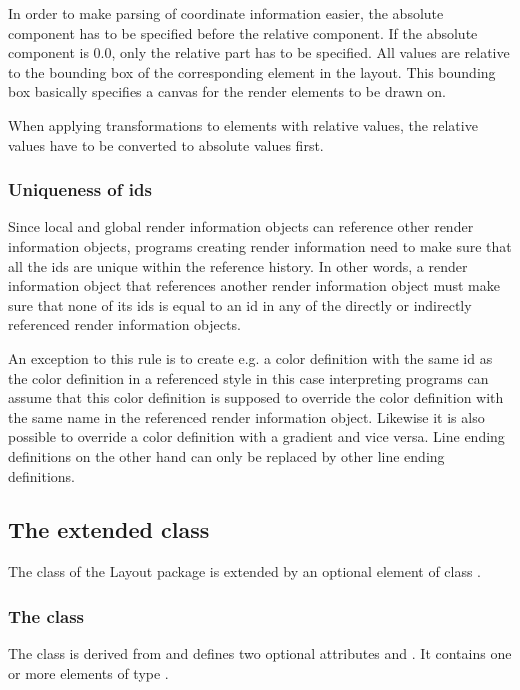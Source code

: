 In order to make parsing of coordinate information easier, the absolute 
component has to be specified before the relative component. If the absolute component is 0.0, only the relative part has to be specified.
All values are relative to the bounding box of the corresponding 
element in the layout. This bounding box basically specifies a canvas for the 
render elements to be drawn on.

When applying transformations to elements with relative values, the relative values have to be converted to absolute values first.



\subsubsection{Uniqueness of ids}
Since local and global render information objects can reference other render information objects, programs creating
render information need to make sure that all the ids are unique within the reference history. In other words, a 
render information object that references another render information object must make sure that none of its ids is equal
to an id in any of the directly or indirectly referenced render information objects. 

An exception to this rule is to create e.g. a color definition with the same id as the color definition in a referenced style
in this case interpreting programs can assume that this color definition is supposed to override the color definition  with the
same name in the referenced render information object. Likewise it is also possible to override a color definition with a 
gradient and vice versa. Line ending definitions on the other hand can only be replaced by other line ending definitions.

\subsection{The extended \ListOfLayouts class}
The \ListOfLayouts class of the Layout package is extended by an optional element  of 
class \ListOfGlobalRenderInformation. 

\subsubsection{The \ListOfGlobalRenderInformation class}
\label{listofrenderinformation-class}
The \ListOfGlobalRenderInformation class is derived from \SBase and defines two optional attributes
 and . It contains one or more elements of type \GlobalRenderInformation.

